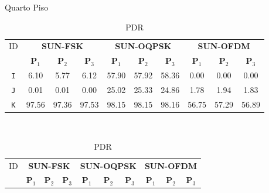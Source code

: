 \begin{table}[H]
      \caption{Quarto Piso}
      \begin{subtable}{\textwidth}
            \begin{center}
                  \begin{tabular}{|c|c|c|c|c|c|c|c|c|c|}
                        \hline
                        ID         & \multicolumn{3}{c|}{\textbf{SUN-FSK}} & \multicolumn{3}{c|}{\textbf{SUN-OQPSK}} & \multicolumn{3}{c|}{\textbf{SUN-OFDM}}                                                                                                       \\ \cline{2-10}
                                   & \textbf{P$_1$}                        & \textbf{P$_2$}                          & \textbf{P$_3$}                         & \textbf{P$_1$} & \textbf{P$_2$} & \textbf{P$_3$} & \textbf{P$_1$} & \textbf{P$_2$} & \textbf{P$_3$} \\ \hline

                        \texttt{I} & 6.10                                  & 5.77                                    & 6.12                                   & 57.90          & 57.92          & 58.36          & 0.00           & 0.00           & 0.00           \\ \hline
                        \texttt{J} & 0.01                                  & 0.01                                    & 0.00                                   & 25.02          & 25.33          & 24.86          & 1.78           & 1.94           & 1.83           \\ \hline
                        \texttt{K} & 97.56                                 & 97.36                                   & 97.53                                  & 98.15          & 98.15          & 98.16          & 56.75          & 57.29          & 56.89          \\ \hline
                  \end{tabular}
                  \caption{PDR}
                  \label{table:pdr4}
            \end{center}
      \end{subtable}%
      \\
      \par\bigskip
      \begin{subtable}{\textwidth}
            \begin{center}
                  \begin{tabular}{|c|c|c|c|c|c|c|c|c|c|}
                        \hline
                        ID         & \multicolumn{3}{c|}{\textbf{SUN-FSK}} & \multicolumn{3}{c|}{\textbf{SUN-OQPSK}} & \multicolumn{3}{c|}{\textbf{SUN-OFDM}}                                                                                                       \\ \cline{2-10}
                                   & \textbf{P$_1$}                        & \textbf{P$_2$}                          & \textbf{P$_3$}                         & \textbf{P$_1$} & \textbf{P$_2$} & \textbf{P$_3$} & \textbf{P$_1$} & \textbf{P$_2$} & \textbf{P$_3$} \\ \hline


\end{tabular}
\end{center}
\end{subtable}
\end{table}
